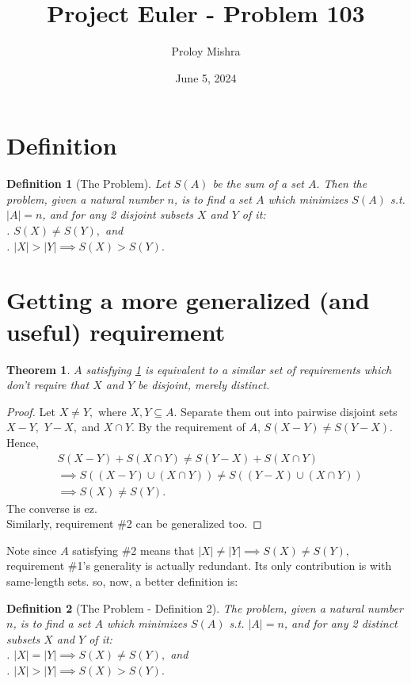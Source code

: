 \documentclass{article}
\title{Project Euler - Problem 103}
\author{Proloy Mishra}
\date{June 5, 2024}
\newtheorem{definition}{Definition}[section]
\newtheorem{theorem}{Theorem}[section]
\begin{document}
  \maketitle
  \section{Definition}
  \begin{definition}[The Problem]
    \label{problemdef1}
    Let $S(A)$ be the sum of a set $A.$ Then the problem, given a natural number $n$, is to find a set $A$ which minimizes $S(A)$ s.t. $|A| = n$, and for any 2 disjoint subsets $X$ and $Y$ of it: \\
    . $S(X) \neq S(Y),$ and \\
    . $|X| > |Y| \implies S(X) > S(Y).$ \\
  \end{definition}
  \section{Getting a more generalized (and useful) requirement}
  \begin{theorem}
    $A$ satisfying \ref{problemdef1} is equivalent to a similar set of requirements which don't require that $X$ and $Y$ be disjoint, merely distinct.
  \end{theorem}
  \begin{proof}
    Let $X \neq Y,$ where $X, Y \subseteq A.$
    Separate them out into pairwise disjoint sets $X - Y,$ $Y - X,$ and $X \cap Y.$ By the requirement of $A$, $S(X-Y) \neq S(Y-X).$
    Hence,
    \begin{align*}
      &S(X-Y)+S(X \cap Y) \neq S(Y-X)+S(X \cap Y) \\
      &\implies S((X - Y) \cup (X \cap Y)) \neq S((Y-X) \cup (X \cap Y)) \\
      &\implies S(X) \neq S(Y).
    \end{align*}
    The converse is ez. \\
    Similarly, requirement \#2 can be generalized too.
  \end{proof}
  Note since $A$ satisfying \#2 means that $|X| \neq |Y| \implies S(X) \neq S(Y),$ requirement \#1's generality is actually redundant. 
  Its only contribution is with same-length sets. so, now, a better definition is:
  \begin{definition}[The Problem - Definition 2]
    \label{problemdef2}
    The problem, given a natural number $n$, is to find a set $A$ which minimizes $S(A)$ s.t. $|A| = n$, 
    and for any 2 distinct subsets $X$ and $Y$ of it: \\
    . $|X| = |Y| \implies S(X) \neq S(Y),$ and \\
    . $|X| > |Y| \implies S(X) > S(Y).$ \\
  \end{definition}
\end{document}
